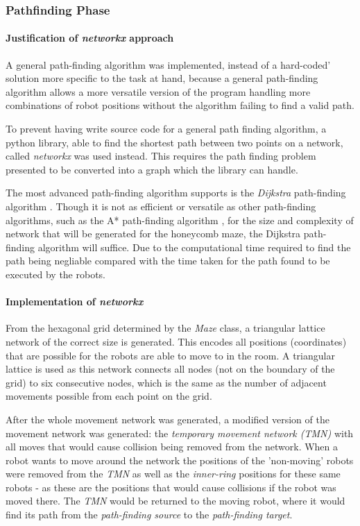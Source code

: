 \subsubsection{Pathfinding Phase}
\label{section:pathfinding}

\paragraph{Justification of \textit{networkx} approach} 

A general path-finding algorithm was implemented, instead of a hard-coded' solution more specific to the task at hand, because a general path-finding algorithm allows a more versatile version of the program handling more combinations of robot positions without the algorithm failing to find a valid path.

To prevent having write source code for a general path finding algorithm, a python library, able to find the shortest path between two points on a network, called \textit{networkx} \cite{networkx} was used instead. This requires the path finding problem presented to be converted into a graph which the library can handle.

The most advanced path-finding algorithm  supports is the \textit{Dijkstra} path-finding algorithm \cite{dijkstra1959pathfinding}. Though it is not as efficient or versatile as other path-finding algorithms, such as the A*  path-finding algorithm \cite{A*_pathfinding} \cite{lit_review_pathfinding}, for the size and complexity of network that will be generated for the honeycomb maze, the Dijkstra path-finding algorithm will  suffice. Due to the computational time required to find the path being negliable compared with the time taken for the path found to be executed by the robots.

\paragraph{Implementation of \textit{networkx}}
From the hexagonal grid determined by the \textit{Maze} class, a triangular lattice network of the correct size is generated. This encodes all positions (coordinates) that are possible for the robots are able to move to in the room. A triangular lattice is used as this network connects all nodes (not on the boundary of the grid) to six consecutive nodes, which is the same as the number of adjacent movements possible from each point on the grid.


After the whole movement network was generated, a modified version of the movement network was generated: the \textit{temporary movement network (TMN)} with all moves that would cause collision being removed from the network. When a robot wants to move around the network the positions of the 'non-moving' robots were removed from the \textit{TMN} as well as the \textit{inner-ring} positions for these same robots - as these are the positions that would cause collisions if the robot was moved there.
The \textit{TMN} would be returned to the moving robot, where it would find its path from the \textit{path-finding source} to the \textit{path-finding target}.

